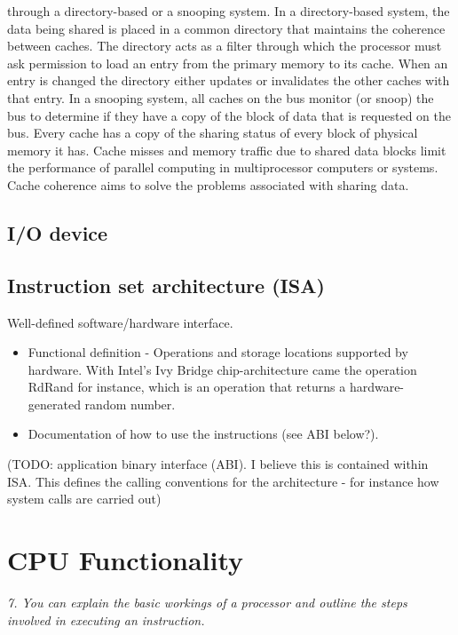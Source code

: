 \documentclass{article}
\begin{document}
through a directory-based or a snooping system. In a directory-based system, the data being shared is placed in a common directory that maintains the coherence between caches. The directory acts as a filter through which the processor must ask permission to load an entry from the primary memory to its cache. When an entry is changed the directory either updates or invalidates the other caches with that entry. In a snooping system, all caches on the bus monitor (or snoop) the bus to determine if they have a copy of the block of data that is requested on the bus. Every cache has a copy of the sharing status of every block of physical memory it has.
Cache misses and memory traffic due to shared data blocks limit the performance of parallel computing in multiprocessor computers or systems. Cache coherence aims to solve the problems associated with sharing data.






\subsection{I/O device}

\subsection{Instruction set architecture (ISA)}
Well-defined software/hardware interface.

\begin{itemize}
	\item Functional definition - Operations and storage locations supported by hardware. With Intel's Ivy Bridge chip-architecture came the operation RdRand for instance, which is an operation that returns a hardware-generated random number.
	\item Documentation of how to use the instructions (see ABI below?).
\end{itemize}

(TODO: application binary interface (ABI). I believe this is contained within ISA. This defines the calling conventions for the architecture - for instance how system calls are carried out)


\section{CPU Functionality}
\label{sec:cpu-func}
\emph{7. You can explain the basic workings of a processor and outline the steps involved in executing an instruction.}

\end{document}
